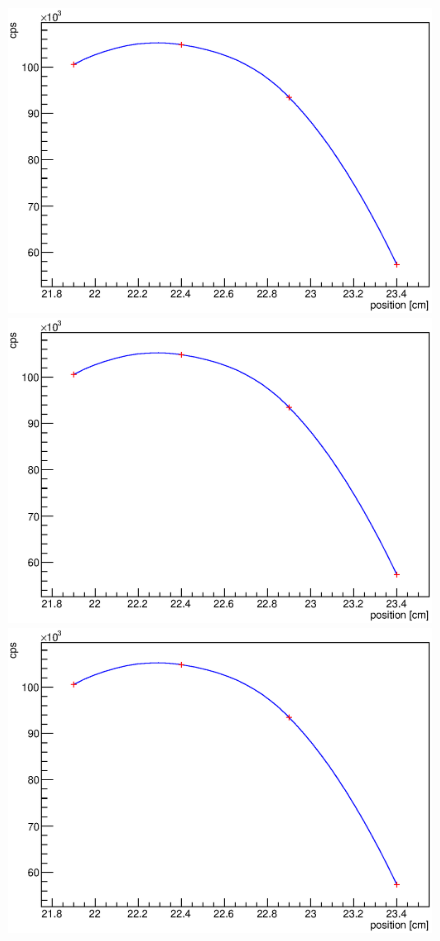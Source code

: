 \begin{figure}
	\begin{minipage}[d]{0.24 \textwidth}
		  \includegraphics[width=\textwidth]{graphics/cobalt/modules/2A.eps}
	\end{minipage}
\begin{minipage}[d]{0.24 \textwidth}
		  \includegraphics[width=\textwidth]{graphics/cobalt/modules/2A.eps}
	\end{minipage}
	\begin{minipage}[d]{0.24 \textwidth}
		  \includegraphics[width=\textwidth]{graphics/cobalt/modules/2A.eps}

\end{minipage}
\end{figure}
